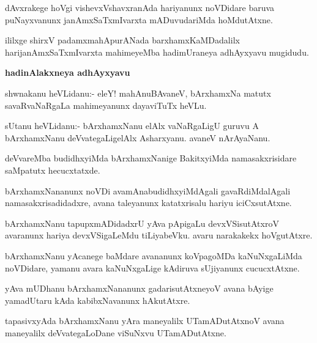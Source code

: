 \begin{mng}
dAvxrakege hoVgi vishevxVshavxranAda hariyanunx noVDidare baruva puNayxvanunx janAmxSaTxmIvarxta mADuvudariMda hoMdutAtxne.
\end{mng}
ililxge shirxV padamxmahApurANada barxhamxKaMDadalilx harijanAmxSaTxmIvarxta mahimeyeMba hadimUraneya adhAyxyavu mugidudu.

\begin{center}
\textbf{\large hadinAlakxneya adhAyxyavu}
\end{center}

\begin{mng}
shwnakanu heVLidanu:- eleY! mahAnuBAvaneV, bArxhamxNa matutx savaRvaNaRgaLa mahimeyanunx dayaviTuTx heVLu.
\end{mng}

\begin{mng}
sUtanu heVLidanu:- bArxhamxNanu elAlx vaNaRgaLigU guruvu A bArxhamxNanu deVvategaLigelAlx Asharxyanu. avaneV nArAyaNanu.
\end{mng}

\begin{mng}
deVvareMba budidhxyiMda bArxhamxNanige BakitxyiMda namasakxrisidare saMpatutx hecucxtatxde.
\end{mng}

\begin{mng}
bArxhamxNananunx noVDi avamAnabudidhxyiMdAgali gavaRdiMdalAgali namasakxrisadidadxre, avana taleyanunx katatxrisalu hariyu iciCxsutAtxne.
\end{mng}

\begin{mng}
bArxhamxNanu tapupxmADidadxrU yAva pApigaLu devxVSisutAtxroV avaranunx hariya devxVSigaLeMdu tiLiyabeVku. avaru narakakekx hoVgutAtxre.
\end{mng}

\begin{mng}
bArxhamxNanu yAcanege baMdare avananunx koVpagoMDa kaNuNxgaLiMda noVDidare, yamanu avara kaNuNxgaLige kAdiruva sUjiyanunx cucucxtAtxne.
\end{mng}

\begin{mng}
yAva mUDhanu bArxhamxNananunx gadarisutAtxneyoV avana bAyige yamadUtaru kAda kabibxNavanunx hAkutAtxre.
\end{mng}

\begin{mng}
tapasivxyAda bArxhamxNanu yAra maneyalilx UTamADutAtxnoV avana maneyalilx deVvategaLoDane viSuNxvu UTamADutAtxne.
\end{mng}

